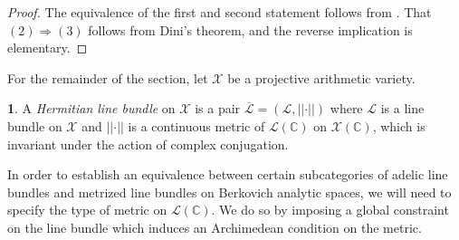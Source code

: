 \documentclass[11pt,reqno]{amsart}
\newcommand{\mZ}{\mathbb{Z}}
\newcommand{\mC}{\mathbb{C}}
\newcommand{\cX}{\mathcal{X}}
\newcommand{\cL}{\mathcal{L}}
\newcommand{\nrm}[1]{\left|\left |#1\right |\right |}
\theoremstyle{theorem}
\numberwithin{equation}{subsection}
\numberwithin{equation}{subsection}
\theoremstyle{definition}
\newtheorem{definition}[subsubsection]{\text{Definition}}
\theoremstyle{remark}
\numberwithin{equation}{subsubsection} \numberwithin{figure}{section}
\newcommand{\cdef}[1]{\textsf{\textit{#1}}}
\begin{document}
\begin{proof}
The equivalence of the first and second statement follows from \cite[Theorem 2.11]{PilleSchneider:Global}. 
That $(2) \Rightarrow (3)$ follows from Dini's theorem, and the reverse implication is elementary.
\end{proof}

For the remainder of the section, let $\cX$ be a projective arithmetic variety. 

\begin{definition}
A \cdef{Hermitian line bundle} on $\cX$ is a pair $\overline{\cL} = (\cL,\nrm{\cdot})$ where $\cL$ is a line bundle on $\cX$ and $\nrm{\cdot}$ is a continuous metric of $\cL(\mC)$ on $\cX(\mC)$, which is invariant under the action of complex conjugation. 
\end{definition}

In order to establish an equivalence between certain subcategories of adelic line bundles and metrized line bundles on Berkovich analytic spaces, we will need to specify the type of metric on $\cL(\mC)$.  
We do so by imposing a global constraint on the line bundle which induces an Archimedean condition on the metric. 
\end{document}

